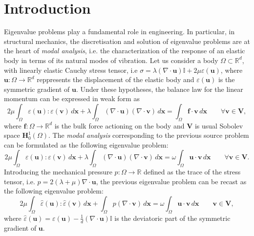 \documentclass[USenglish]{article}
\theoremstyle{dgthm}
\theoremstyle{dgdef}
\let\vec\bm
\begin{document}
\section{Introduction}
Eigenvalue problems play a fundamental role in engineering. In particular, in structural mechanics, the discretisation and solution of eigenvalue problems are at the heart of \textit{modal analysis}, i.e. the characterization of the response of an elastic body in terms of its natural modes of vibration.
Let us consider a body $\Omega\subset \mathbb{R}^d$, with linearly elastic Cauchy stress tensor, i.e $\sigma = \lambda (\nabla\cdot \vec{u})\mathbb{I}+2\mu\varepsilon(\vec{u})$, where $\vec{u}:\Omega\to \mathbb{R}^d$ reppresents the displacement of the elastic body and $\varepsilon(\vec{u})$ is the symmetric gradient of $\vec{u}$.
Under these hypotheses, the balance law for the linear momentum can be expressed in weak form as 
\begin{equation}
  \label{eq:elasticityPrimalSource}
  2\mu \int_{\Omega} \varepsilon(\vec{u}):\varepsilon(\vec{v})\, d\vec{x} + \lambda \int_{\Omega} (\nabla \cdot \vec{u})(\nabla\cdot \vec{v})\, d\vec{x} = \int_{\Omega}\vec{f}\cdot \vec{v} \,d\vec{x} \qquad \forall \vec{v}\in \vec{V},
\end{equation}
where $\vec{f}:\Omega\to \mathbb{R}^d$ is the bulk force actioning on the body and $\vec{V}$ is usual Sobolev space $\vec{H}^1_0(\Omega)$. The \textit{modal analysis} corresponding to the previous source problem can be formulated as the following eigenvalue problem:
\begin{equation}
  \label{eq:elasticityPrimalEig}
  2\mu \int_{\Omega} \varepsilon(\vec{u}):\varepsilon(\vec{v})\, d\vec{x} + \lambda \int_{\Omega} (\nabla \cdot \vec{u})(\nabla\cdot \vec{v})\, d\vec{x} = \omega \int_{\Omega}\vec{u}\cdot \vec{v} \,d\vec{x} \qquad \forall \vec{v} \in \vec{V}.
\end{equation}
Introducing the mechanical pressure $p:\Omega\to \mathbb{R}$ defined as the trace of the stress tensor, i.e. $p = 2(\lambda+\mu) \nabla\cdot \vec{u}$, the previous eigenvalue problem can be recast as the following eigenvalue problem:
\begin{equation}
  \label{eq:elasticityPressureEig}
    2\mu \int_\Omega \widehat\varepsilon(\vec{u}):\widehat \varepsilon(\vec{v})\, d\vec{x}+\int_\Omega p (\nabla \cdot \vec{v})\, d\vec{x} = \omega \int_\Omega \vec{u}\cdot \vec{v}\, d\vec{x} \qquad \vec{v}\in \vec{V},
\end{equation}
where $\widehat\varepsilon(\vec{u}) = \varepsilon(\vec{u})-\frac{1}{d}(\nabla\cdot \vec{u})\mathbb{I}$ is the deviatoric part of the symmetric gradient of $\vec{u}$.
\end{document}

